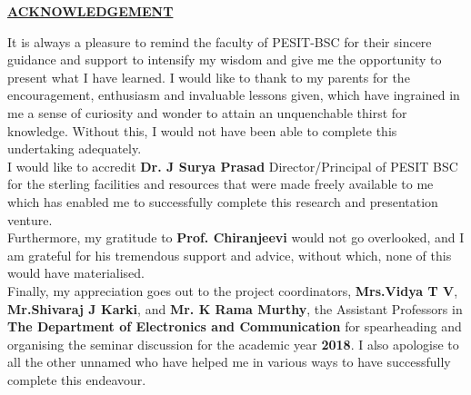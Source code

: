 \documentclass[12pt,a4paper]{report}
\begin{document}
\begin{center}\underline{ \Large\textbf{ACKNOWLEDGEMENT}}\end{center}
It is always a pleasure to remind the faculty of PESIT-BSC for their sincere guidance and support to intensify my wisdom and give me the opportunity to present what I have learned. I would like to thank to my parents for the encouragement, enthusiasm and invaluable lessons given, which have ingrained in me a sense of curiosity and wonder to attain an unquenchable thirst for knowledge. Without this, I would not have been able to complete this undertaking adequately.\\

I would like to accredit \textbf{Dr. J Surya Prasad} Director/Principal of PESIT BSC for the sterling facilities and resources that were made freely available to me which has enabled me to successfully complete this research and presentation venture.\\

Furthermore, my gratitude to \textbf{Prof. Chiranjeevi} would not go overlooked, and I am grateful for his tremendous support and advice, without which, none of this would have materialised.\\

Finally, my appreciation goes out to the project coordinators, \textbf{ Mrs.Vidya T V},\textbf{ Mr.Shivaraj J Karki}, and \textbf{ Mr. K Rama Murthy}, the Assistant Professors in \textbf{The Department of Electronics and Communication} for spearheading and organising the seminar discussion for the academic year  \textbf{2018}.
I also apologise to all the other unnamed who have helped me in various ways to have successfully complete this endeavour.
\end{document}
